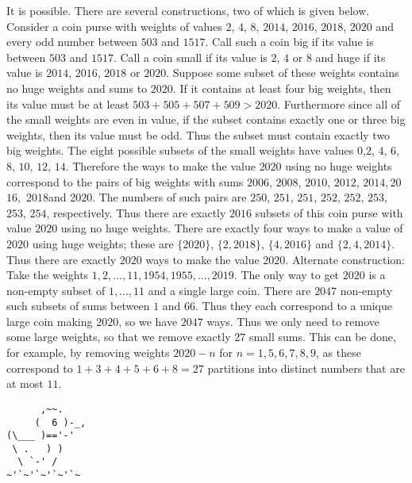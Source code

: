 \documentclass{article}
\begin{document}
\begin{enumerate}[1.]
It is possible. There are several constructions, two of which is given below. Consider a coin purse with weights of values $2$, $4$, $8$, $2014$, $2016$, $2018$, $2020$ and every odd number between $503$ and $1517$. Call such a coin big if its value is between $503$ and $1517$. Call a coin small if its value is $2$, $4$ or $8$ and huge if its value is $2014$, $2016$, $2018$ or $2020$. Suppose some subset of these weights contains no huge weights and sums to $2020$. If it contains at least four big weights, then its value must be at least $503 + 505 + 507 + 509 > 2020$. Furthermore since all of the small weights are even in value, if the subset contains exactly one or three big weights, then its value must be odd. Thus the subset must contain exactly two big weights. The eight possible subsets of the small weights have values $0$,$2$, $4$, $6$, $8$, $10$, $12$, $14$. Therefore the ways to make the value $2020$ using no huge weights correspond to the pairs of big weights with sums $2006$, $2008$, $2010$, $2012$, $2014, 2$0$16,$ 2$018 $and 20$20.$ The numbers of such pairs are $250$, $251$, $251$, $252$, $252$, $253$, $253$, $254$, respectively. Thus there are exactly $2016$ subsets of this coin purse with value $2020$ using no huge weights. There are exactly four ways to make a value of $2020$ using huge weights; these are $\{2020\}$, $\{2, 2018\}$, $\{4, 2016\}$ and $\{2, 4, 2014\}$. Thus there are exactly $2020$ ways to make the value $2020$. Alternate construction: Take the weights $1, 2, . . . , 11, 1954, 1955, . . . , 2019$. The only way to get $2020$ is a non-empty subset of $1, . . . , 11$ and a single large coin. There are $2047$ non-empty such subsets of sums between $1$ and $66$. Thus they each correspond to a unique large coin making $2020$, so we have $2047$ ways. Thus we only need to remove some large weights, so that we remove exactly $27$ small sums. This can be done, for example, by removing weights $2020 − n$ for $n = 1, 5, 6, 7, 8, 9$, as these correspond to $1 + 3 + 4 + 5 + 6 + 8 = 27$ partitions into distinct numbers that are at most $11$.

\end{enumerate}


\vfill
\centering
\begin{BVerbatim}
      ,~~.
     (  6 )-_,
(\___ )=='-'
 \ .   ) )
  \ `-' /    
~'`~'`~'`~'`~
\end{BVerbatim}
\end{document}
